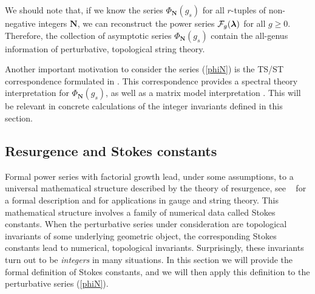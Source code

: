 \documentclass[a4paper,11pt]{article}
\theoremstyle{definition}
\newcommand{\CF}{{\cal F}}
\def\blambda{\boldsymbol{\lambda}}
\def\bN{{\boldsymbol{N}}}
\begin{document}
We should note that, if we know the series $\Phi_{\bN} (g_s)$ for all
$r$-tuples of non-negative integers $\bN$, we can reconstruct the power
series $\CF_g(\blambda)$ for all $g \ge 0$. Therefore, the collection
of asymptotic series $\Phi_{\bN} (g_s)$ contain the all-genus
information of perturbative, topological string theory.

Another important motivation to consider the series (\ref{phiN}) is
the TS/ST correspondence formulated in \cite{ghm,cgm}. This
correspondence provides a spectral theory interpretation for
$\Phi_{\bN} (g_s)$, as well as a matrix model interpretation
\cite{mz,kmz}. This will be relevant in concrete calculations of the
integer invariants defined in this section.

\subsection{Resurgence and Stokes constants}
\label{sc:resurg}

Formal power series with factorial growth lead, under some assumptions, to a universal mathematical structure 
described by the theory of resurgence, see ~\cite{abs,msauzin} for a formal description and \cite{mmbook,mmlargen} for applications 
in gauge and string theory. This mathematical structure involves a family of numerical data called Stokes constants. 
When the perturbative series under consideration 
are topological invariants of some underlying geometric object, the corresponding Stokes constants lead to 
numerical, topological invariants. Surprisingly, these 
invariants turn out to be {\it integers} in many situations. In this section we will provide the formal definition of Stokes constants, and we will then apply this definition to the 
perturbative series (\ref{phiN}). 
\end{document}
